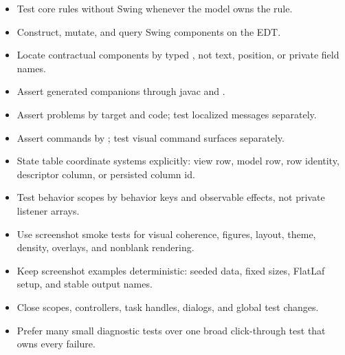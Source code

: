 \begin{itemize}
\item Test core rules without Swing whenever the model owns the rule.
\item Construct, mutate, and query Swing components on the EDT.
\item Locate contractual components by typed , not text, position, or private field names.
\item Assert generated companions through javac and .
\item Assert problems by target and code; test localized messages separately.
\item Assert commands by ; test visual command surfaces separately.
\item State table coordinate systems explicitly: view row, model row, row identity, descriptor column, or persisted column id.
\item Test behavior scopes by behavior keys and observable effects, not private listener arrays.
\item Use screenshot smoke tests for visual coherence, figures, layout, theme, density, overlays, and nonblank rendering.
\item Keep screenshot examples deterministic: seeded data, fixed sizes, FlatLaf setup, and stable output names.
\item Close scopes, controllers, task handles, dialogs, and global test changes.
\item Prefer many small diagnostic tests over one broad click-through test that owns every failure.
\end{itemize}
